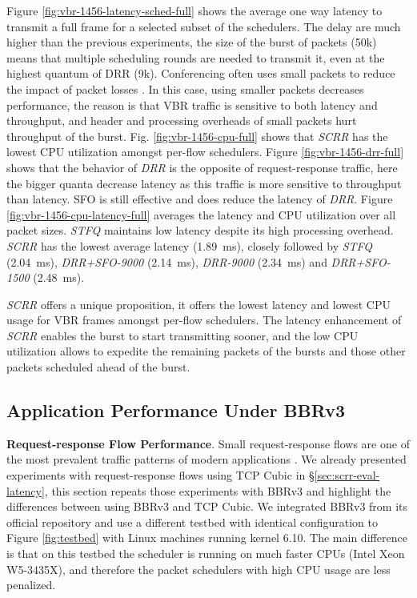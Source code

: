Figure \ref{fig:vbr-1456-latency-sched-full} shows the average one way
latency to transmit a full frame for a selected subset of the
schedulers. The delay are much higher than the previous experiments,
the size of the burst of packets (50k) means that multiple scheduling
rounds are needed to transmit it, even at the highest quantum of DRR
(9k). Conferencing often uses small packets to reduce the impact of
packet losses \cite{zoom, webrtc-teams}. In this case, using smaller
packets decreases performance, the reason is that VBR traffic is
sensitive to both latency and throughput, and header and processing
overheads of small packets hurt throughput of the burst. Fig.
\ref{fig:vbr-1456-cpu-full} shows that \textit{SCRR} has the lowest CPU
utilization amongst per-flow
schedulers. Figure \ref{fig:vbr-1456-drr-full} shows that the behavior
of \textit{DRR} is the opposite of request-response traffic, here the bigger
quanta decrease latency as this traffic is more sensitive to
throughput than latency. SFO is still effective and does reduce the
latency of \textit{DRR}. Figure \ref{fig:vbr-1456-cpu-latency-full} averages the
latency and CPU utilization over all packet sizes. \textit{STFQ} maintains low
latency despite its high processing overhead.
\textit{SCRR} has the lowest average latency (1.89~ms),
closely followed by \textit{STFQ} (2.04~ms), \textit{DRR+SFO-9000}
(2.14~ms), \textit{DRR-9000}
(2.34~ms) and \textit{DRR+SFO-1500}
(2.48~ms).

\textit{SCRR} offers a unique
proposition, it offers the lowest latency and lowest CPU usage for VBR
frames amongst per-flow schedulers. The latency enhancement of \textit{SCRR}
enables the burst to start transmitting sooner, and the low CPU
utilization allows to expedite the remaining packets of the
bursts and those other packets scheduled ahead of the burst.




\subsection{Application Performance Under BBRv3}
\label{app:bbr3}

\textbf{Request-response Flow Performance}.
Small request-response flows are one of the most prevalent traffic patterns 
of modern applications \cite{wild,social,homa}. We already presented
experiments with request-response flows using TCP Cubic in
\S\ref{sec:scrr-eval-latency}, this section
repeats those experiments with BBRv3 and highlight the differences
between using BBRv3 and TCP Cubic. We integrated BBRv3 from its
official repository \cite{bbr3} and use a different testbed with
identical configuration to Figure \ref{fig:testbed} with Linux machines
running kernel 6.10. The main difference is that on this testbed the
scheduler is running on much faster CPUs (Intel Xeon W5-3435X), and
therefore the packet schedulers with high CPU usage are less
penalized.

